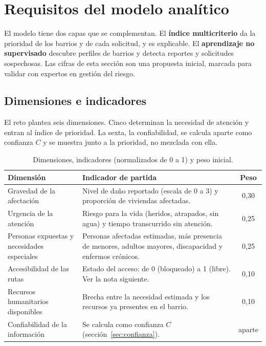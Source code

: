 \section{Requisitos del modelo analítico}

El modelo tiene dos capas que se complementan. El \textbf{índice multicriterio} da la prioridad de los barrios y de cada solicitud, y es explicable. El \textbf{aprendizaje no supervisado} descubre perfiles de barrios y detecta reportes y solicitudes sospechosas. Las cifras de esta sección son una propuesta inicial, marcada para validar con expertos en gestión del riesgo.

\subsection{Dimensiones e indicadores}
El reto plantea seis dimensiones. Cinco determinan la necesidad de atención y entran al índice de prioridad. La sexta, la confiabilidad, se calcula aparte como confianza $C$ y se muestra junto a la prioridad, no mezclada con ella.

\begin{table}[H]
\centering
\caption{Dimensiones, indicadores (normalizados de 0 a 1) y peso inicial.}
\begin{tabularx}{\textwidth}{@{}p{3.3cm}Xc@{}}
\toprule
\textbf{Dimensión} & \textbf{Indicador de partida} & \textbf{Peso} \\
\midrule
Gravedad de la afectación & Nivel de daño reportado (escala de 0 a 3) y proporción de viviendas afectadas. & 0,30 \\
Urgencia de la atención & Riesgo para la vida (heridos, atrapados, sin agua) y tiempo transcurrido sin atención. & 0,25 \\
Personas expuestas y necesidades especiales & Personas afectadas estimadas, más presencia de menores, adultos mayores, discapacidad y enfermos crónicos. & 0,25 \\
Accesibilidad de las rutas & Estado del acceso: de 0 (bloqueado) a 1 (libre). Ver la nota siguiente. & 0,10 \\
Recursos humanitarios disponibles & Brecha entre la necesidad estimada y los recursos ya presentes en el barrio. & 0,10 \\
\midrule
Confiabilidad de la información & Se calcula como confianza $C$ (sección~\ref{sec:confianza}). & aparte \\
\bottomrule
\end{tabularx}
\end{table}

